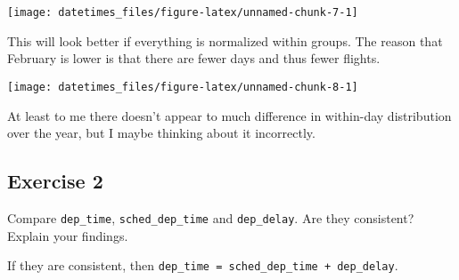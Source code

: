 \documentclass[]{book}
\newenvironment{Shaded}{\begin{snugshade}}{\end{snugshade}}
\newcommand{\DataTypeTok}[1]{\textcolor[rgb]{0.13,0.29,0.53}{#1}}
\newcommand{\DecValTok}[1]{\textcolor[rgb]{0.00,0.00,0.81}{#1}}
\newcommand{\KeywordTok}[1]{\textcolor[rgb]{0.13,0.29,0.53}{\textbf{#1}}}
\newcommand{\NormalTok}[1]{#1}
\newcommand{\OperatorTok}[1]{\textcolor[rgb]{0.81,0.36,0.00}{\textbf{#1}}}
\newcommand{\StringTok}[1]{\textcolor[rgb]{0.31,0.60,0.02}{#1}}
\theoremstyle{definition}
\theoremstyle{definition}
\theoremstyle{definition}
\theoremstyle{remark}
\begin{document}
\begin{center}\texttt{[image: datetimes\_files/figure-latex/unnamed-chunk-7-1]} \end{center}

This will look better if everything is normalized within groups. The
reason that February is lower is that there are fewer days and thus
fewer flights.

\begin{Shaded}
\end{Shaded}

\begin{center}\texttt{[image: datetimes\_files/figure-latex/unnamed-chunk-8-1]} \end{center}

At least to me there doesn't appear to much difference in within-day
distribution over the year, but I maybe thinking about it incorrectly.

\hypertarget{exercise-2-41}{%
\subsection{Exercise 2}\label{exercise-2-41}}

Compare \texttt{dep\_time}, \texttt{sched\_dep\_time} and
\texttt{dep\_delay}. Are they consistent? Explain your findings.

If they are consistent, then
\texttt{dep\_time\ =\ sched\_dep\_time\ +\ dep\_delay}.
\end{document}

